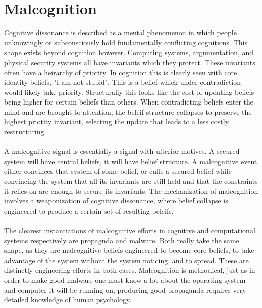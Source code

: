 \documentclass{article}
\begin{document}
	\section{Malcognition}
	Cognitive dissonance is described as a mental phenomenon in which people unknowingly or subconsciously hold fundamentally conflicting cognitions. This shape exists beyond cognition however. Computing systems, argumentation, and physical security systems all have invariants which they protect. These invariants often have a heirarchy of priority. In cognition this is clearly seen with core identity beliefs, "I am not stupid". This is a belief which under contradiction would likely take priority. Structurally this looks like the cost of updating beliefs being higher for certain beliefs than others. When contradicting beliefs enter the mind and are brought to attention, the beleif structure collapses to preserve the highest priotity invariant, selecting the update that leads to a less costly restructuring. \\\\
	A malcognitive signal is essentially a signal with ulterior motives. A secured system will have central beliefs, it will have belief structure. A malcognitive event either convinces that system of some belief, or culls a secured belief while convincing the system that all its invariants are still held and that the constraints it relies on are enough to secure its invariants. The mechanization of malcognition involves a weaponization of cognitive dissonance, where belief collapse is engineered to produce a certain set of resulting beleifs.\\\\
	The clearest instantiations of malcognitive efforts in cognitive and computational systems respectively are propagnda and malware. Both really take the same shape, as they are malcognitive beliefs engineered to become core beliefs, to take advantage of the system without the system noticing, and to spread. These are distinctly engineering efforts in both cases. Malcognition is methodical, just as in order to make good malware one must know a lot about the operating system and computer it will be running on, producing good propaganda requires very detailed knowledge of human psychology.\\\\
\end{document}
